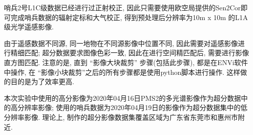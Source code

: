 哨兵2号L1C级数据已经进行过正射校正, 因此只需要使用欧空局提供的Sen2Cor即可完成哨兵数据的辐射定标和大气校正, 得到预处理后分辨率为10m x 10m 的L1A级光学遥感影像. 

由于遥感数据不同源, 同一地物在不同源影像中位置不同,  因此需要对遥感影像进行精细匹配; 超分数据要求图像色彩一致, 因此在进行空间精匹配后, 需要进行影像直方图匹配. 注意的是, 直到 ``影像大块裁剪'' 步骤(包括此步骤), 都是在ENVi软件中操作, 在 ``影像小块裁剪''之后的所有步骤都是使用python脚本进行操作. 这样做的目的是为了效率更高.

本次实验中使用的高分影像为2020年04月16日PMS2的多光谱影像作为超分数据中的高分辨率影像; 使用的哨兵数据为2020年04月19日的影像作为超分数据集中的低分辨率影像. 理论上, 制作的超分影像数据集覆盖区域为广东省东莞市和惠州市附近. 


